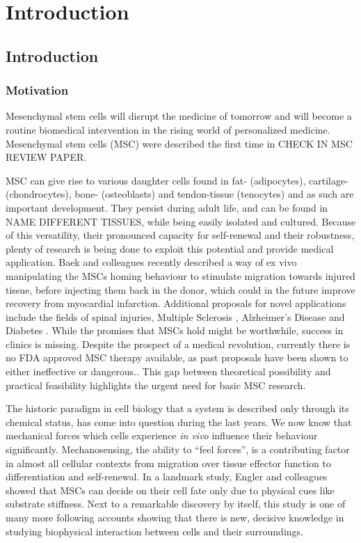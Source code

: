 
\chapter{Introduction}

\section{Introduction}
\subsection{Motivation}
\label{sec:motivation}
Mesenchymal stem cells will disrupt the medicine of tomorrow and will become a routine biomedical intervention in the rising world of personalized medicine. 
Mesenchymal stem cells (MSC) were described the first time in CHECK IN MSC REVIEW PAPER. 

MSC can give rise to various daughter cells found in fat- (adipocytes), cartilage- (chondrocytes), bone- (osteoblasts) and tendon-tissue (tenocytes) \cite{Barlow2008, Hass2011} and as such are important development.
They persist during adult life, and can be found in NAME DIFFERENT TISSUES, while being easily isolated and cultured. Because of this versatility, their pronounced capacity for self-renewal and their robustness, plenty of research is being done to exploit this potential and provide medical application. Baek and colleagues recently described a way of ex vivo manipulating the MSCs homing behaviour to stimulate migration towards injured tissue, before injecting them back in the donor, which could in the future improve recovery from myocardial infarction. \cite{Baek2011}  Additional proposals for novel applications include the fields of spinal injuries\cite{Goldschlager2010}, Multiple Sclerosis \cite{Planchon2018}, Alzheimer's Disease \cite{Han2018, Hao2012} and Diabetes \cite{Evangelista2018}.  While the promises that MSCs hold might be worthwhile, success in clinics is missing. Despite the prospect of a medical revolution, currently there is no FDA approved MSC therapy available, as past proposals have been shown to either ineffective or dangerous.\cite{Amariglio2009}. This gap between theoretical possibility and practical feasibility highlights the urgent need for basic MSC research.\par

The historic paradigm in cell biology that a system is described only through its chemical status, has come into question during the last years. We now know that mechanical forces which cells experience \textit{in vivo} influence their behaviour significantly\cite{Hao2015}. Mechanosensing, the ability to “feel forces”, is a contributing factor in almost all cellular contexts from migration over tissue effector function to differentiation and self-renewal. In a landmark study, Engler and colleagues\cite{Engler2006} showed that MSCs can decide on their cell fate only due to physical cues like substrate stiffness. Next to a remarkable discovery by itself, this study is one of many more following accounts showing that there is new, decisive knowledge in studying biophysical interaction between cells and their surroundings.\par

